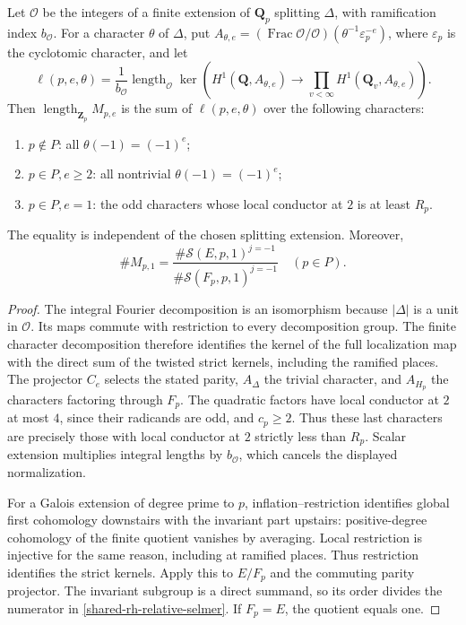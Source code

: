 \begin{proposition}
\label{shared-rh-integral-product}
Let \(\mathcal O\) be the integers of a finite extension of
\(\mathbf Q_p\) splitting \(\Delta\), with ramification index
\(b_{\mathcal O}\). For a character \(\theta\) of \(\Delta\), put
\(A_{\theta,e}=(\operatorname{Frac}\mathcal O/\mathcal O)
(\theta^{-1}\varepsilon_p^{-e})\), where \(\varepsilon_p\) is the
cyclotomic character, and let
\[
 \ell(p,e,\theta)=\frac1{b_{\mathcal O}}\operatorname{length}_{\mathcal O}
 \ker\left(H^1(\mathbf Q,A_{\theta,e})
       \longrightarrow\prod_{v<\infty}
         H^1(\mathbf Q_v,A_{\theta,e})\right).
\]
Then
\(\operatorname{length}_{\mathbf Z_p}M_{p,e}\) is the sum of
\(\ell(p,e,\theta)\) over the following characters:
\begin{enumerate}
\item \(p\notin P\): all \(\theta(-1)=(-1)^e\);
\item \(p\in P,e\ge2\): all nontrivial \(\theta(-1)=(-1)^e\);
\item \(p\in P,e=1\): the odd characters whose local conductor at
      \(2\) is at least \(R_p\).
\end{enumerate}
The equality is independent of the chosen splitting extension. Moreover,
\begin{equation}\label{shared-rh-relative-selmer}
 \#M_{p,1}=\frac{\#\mathcal S(E,p,1)^{j=-1}}
                  {\#\mathcal S(F_p,p,1)^{j=-1}}\quad(p\in P).
\end{equation}
\end{proposition}
\begin{proof}
The integral Fourier decomposition is an isomorphism because
\(|\Delta|\) is a unit in \(\mathcal O\). Its maps commute with
restriction to every decomposition group. The finite character
decomposition therefore identifies the kernel of the full localization
map with the direct sum of the twisted strict kernels, including the
ramified places. The projector \(C_e\) selects the stated parity,
\(A_\Delta\) the trivial character, and \(A_{H_p}\) the characters
factoring through \(F_p\). The quadratic factors have local conductor
at \(2\) at most \(4\), since their radicands are odd, and
\(c_p\ge2\). Thus these last characters are precisely those with
local conductor at \(2\) strictly less than \(R_p\).
Scalar extension multiplies integral lengths by
\(b_{\mathcal O}\), which cancels the displayed normalization.

For a Galois extension of degree prime to \(p\), inflation--restriction
identifies global first cohomology downstairs with the invariant part
upstairs: positive-degree cohomology of the finite quotient vanishes by
averaging. Local restriction is injective for the same reason, including
at ramified places. Thus restriction identifies the strict kernels.
Apply this to \(E/F_p\) and the commuting parity projector.
The invariant subgroup is a direct summand, so its order divides the
numerator in \eqref{shared-rh-relative-selmer}. If \(F_p=E\), the
quotient equals one.
\end{proof}

